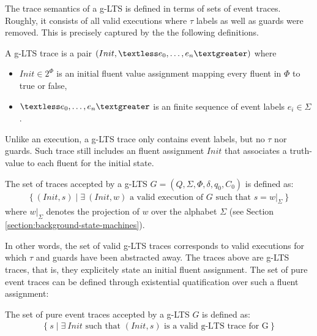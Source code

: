 The trace semantics of a g-LTS is defined in terms of sets of event traces. Roughly, it consists of all valid executions where $\tau$ labels as well as guards were removed. This is precisely captured by the the following definitions.

\begin{definition}
A g-LTS trace is a pair $(Init,\textless e_0,\ldots,e_n\textgreater)$ where 
\begin{itemize}
\item $Init \in 2^\Phi$ is an initial fluent value assignment mapping every fluent in $\Phi$ to true or false,
\item $\textless e_0,\ldots,e_n \textgreater$ is an finite sequence of event labels $e_i \in \Sigma$.
\end{itemize}
\end{definition}

Unlike an execution, a g-LTS trace only contains event labels, but no $\tau$ nor guards. Such trace still includes an fluent assignment $Init$ that associates a truth-value to each fluent for the initial state.

\begin{definition}
The set of traces accepted by a g-LTS $G = (Q,\Sigma,\Phi,\delta,q_{0},C_{0})$ is defined as:
\begin{align*}
\{~(Init, s) \mid \exists~(Init, w) \mbox{~a valid execution of $G$ such that~} s = w|_{\Sigma}~\}
\end{align*}
where $w|_{\Sigma}$ denotes the projection of $w$ over the alphabet $\Sigma$ (see Section \ref{section:background-state-machines}).
\end{definition}

In other words, the set of valid g-LTS traces corresponds to valid executions for which $\tau$ and guards have been abstracted away. The traces above are g-LTS traces, that is, they explicitely state an initial fluent assignment. The set of pure event traces can be defined through existential quatification over such a fluent assignment:

\begin{definition}
The set of pure event traces accepted by a g-LTS $G$ is defined as:
\begin{align*}
\{~ s \mid \exists~Init \mbox{~such that~} (Init,s) \mbox{~is a valid g-LTS trace for G}~\}
\end{align*}
\end{definition}

